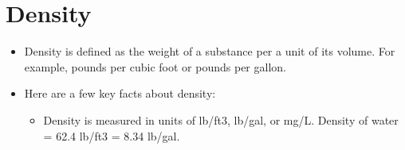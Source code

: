 \documentclass{article}
\begin{document}
\section*{Density}
\begin{itemize}
\item Density is defined as the weight of a substance per a unit of its volume. For example, pounds per cubic foot or pounds per gallon.

\item Here are a few key facts about density:
\begin{itemize}

\item Density is measured in units of lb/ft3, lb/gal, or mg/L. Density of water = 62.4 lb/ft3 = 8.34 lb/gal.
\end{itemize}
\end{itemize}
\end{document}
